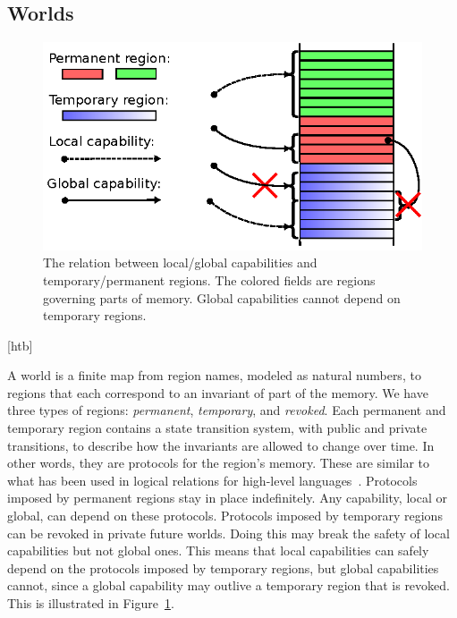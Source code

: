\documentclass[format=acmsmall, review=false, screen=true]{acmart}
\renewcommand{\figurename}{Figure}
\newcommand\lau[1]{{\color{purple} \sf \footnotesize {LS: #1}}\\}
\newcommand\dominique[1]{{\color{purple} \sf \footnotesize {DD: #1}}\\}
\renewcommand\lau[1]{}
\renewcommand\dominique[1]{}
\newcommand{\plainview}[1]{\mathrm{#1}}
\newcommand{\perma}{\plainview{perm}}
\newcommand{\temp}{\plainview{temp}}
\newcommand{\revoked}{\plainview{revoked}}
\begin{document}
\subsection{Worlds}
\begin{figure}[htb]
  \centering
  \includegraphics{w11}

  \caption{The relation between local/global capabilities and temporary/permanent
    regions. The colored fields are regions governing parts of memory. Global capabilities cannot depend on temporary
    regions.}
  \label{fig:cap-world}
\end{figure}[htb]


A world is a
finite map from region names, modeled as natural numbers, to regions that each
correspond to an invariant of part of the memory.  We have three types of
regions: \emph{permanent}, \emph{temporary}, and \emph{revoked}.
Each permanent and temporary region contains a state transition system, with
public and private transitions, to describe how the invariants are allowed to
change over time. In other words, they are protocols for the region's
memory. These are similar to what has been used in logical relations for
high-level
languages~\citep{Ahmed:popl09,Dreyer:jfp12,Devriese:2016ObjCap}. Protocols
imposed by permanent regions stay in place indefinitely. Any capability, local
or global, can depend on these protocols. Protocols imposed by temporary regions
can be revoked in private future worlds. Doing this may break the safety of
local capabilities but not global ones. This means that local capabilities
can safely depend on the protocols imposed by temporary regions, but global
capabilities cannot, since a global capability may outlive a temporary region
that is revoked. This is illustrated in \figurename~\ref{fig:cap-world}.
\end{document}
